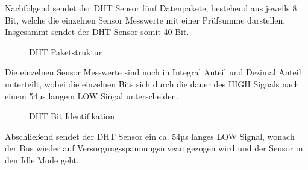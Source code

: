 \newpage

Nachfolgend sendet der DHT Sensor fünf Datenpakete, bestehend aus jeweils 8 Bit, welche die einzelnen Sensor Messwerte mit einer Prüfsumme darstellen. Insgesammt sendet der DHT Sensor somit 40 Bit.

\begin{center}
	\begin{figure}[h]
	 
	 \noindent{}
	 \caption[DHT Paketstruktur]{DHT Paketstruktur}
	 \label{fig:dhtpaketstruktur}
	\end{figure}
\end{center}

Die einzelnen Sensor Messwerte sind noch in Integral Anteil und Dezimal Anteil unterteilt, wobei die einzelnen Bits sich durch die dauer des HIGH Signals nach einem 54µs langem LOW Singal unterscheiden.

\begin{center}
	\begin{figure}[h]
	 
	 \noindent{}
	 \caption[DHT Bit Identifikation]{DHT Bit Identifikation}
	 \label{fig:dhtbits}
	\end{figure}
\end{center}

Abschließend sendet der DHT Sensor ein ca. 54µs langes LOW Signal, wonach der Bus wieder auf Versorgungsspannungsniveau gezogen wird und der Sensor in den Idle Mode geht.



